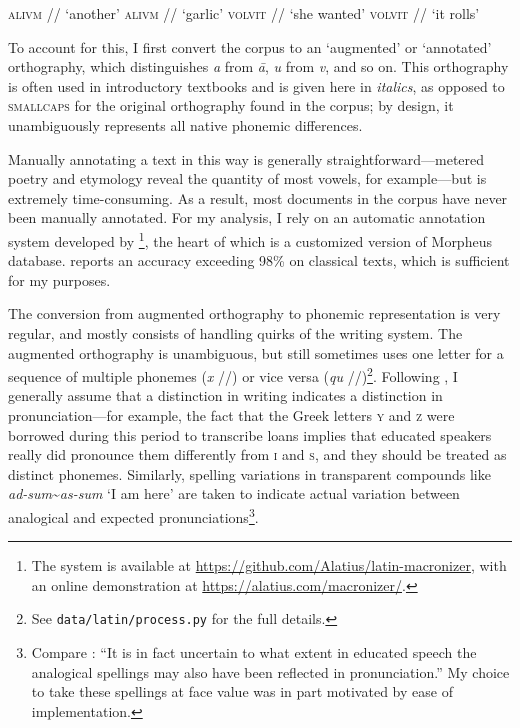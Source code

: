 \documentclass[12pt,twoside,leqno]{article} %
\newcommand{\ipa}[1]{/\textipa{#1}/}
\begin{document}

\begin{exe}
\ex \textsc{alivm} \ipa{a.li.um} `another'
\ex \textsc{alivm} \ipa{a:.li.um} `garlic'
\ex \textsc{volvit} \ipa{wo.lu.it} `she wanted'
\ex \textsc{volvit} \ipa{wol.wit} `it rolls'
\end{exe}

To account for this, I first convert the corpus to an `augmented' or `annotated' orthography, which distinguishes \emph{a} from \emph{\=a}, \emph{u} from \emph{v}, and so on. This orthography is often used in introductory textbooks and is given here in \emph{italics}, as opposed to \textsc{smallcaps} for the original orthography found in the corpus; by design, it unambiguously represents all native phonemic differences.

Manually annotating a text in this way is generally straightforward---metered poetry and etymology reveal the quantity of most vowels, for example---but is extremely time-consuming. As a result, most documents in the corpus have never been manually annotated. For my analysis, I rely on an automatic annotation system developed by \citet{winge}\footnote{The system is available at \url{https://github.com/Alatius/latin-macronizer}, with an online demonstration at \url{https://alatius.com/macronizer/}.}, the heart of which is a customized version of  Morpheus database. \citet[27]{winge} reports an accuracy exceeding 98\% on classical texts, which is sufficient for my purposes.


The conversion from augmented orthography to phonemic representation is very regular, and mostly consists of handling quirks of the writing system. The augmented orthography is unambiguous, but still sometimes uses one letter for a sequence of multiple phonemes (\emph{x} \ipa{ks}) or vice versa (\emph{qu} \ipa{k\super{w}})\footnote{See \texttt{data/latin/process.py} for the full details.}. Following \citet{allen}, I generally assume that a distinction in writing indicates a distinction in pronunciation---for example, the fact that the Greek letters \textsc{y} and \textsc{z} were borrowed during this period to transcribe loans implies that educated speakers really did pronounce them differently from \textsc{i} and \textsc{s}, and they should be treated as distinct phonemes. Similarly, spelling variations in transparent compounds like \emph{ad-sum}\textasciitilde\emph{as-sum} `I am here' are taken to indicate actual variation between analogical and expected pronunciations\footnote{Compare \citet[22]{allen}: ``It is in fact uncertain to what extent in educated speech the analogical spellings may also have been reflected in pronunciation.'' My choice to take these spellings at face value was in part motivated by ease of implementation.}.
\end{document}
